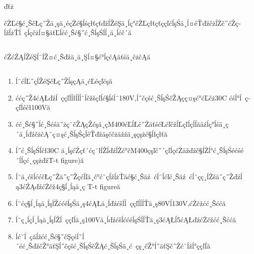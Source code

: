 ďťż\documentclass[10.5pt]{article}
\begin{document}
čŻĽć§ć¸ŠčŁç˝Žä¸şä¸é­çŻć§ĺśçłťçťďźĺŽéŞä¸­ĺç°čŻĽçłťçťççľćĺşŚä¸ĺ¤éŤďźčżĺŻč˝ćŻç­ĺžĺżŤĺ ç­ĺçčżĺ¤§äťĽĺćć¸Šć§˝ć¸ŠĺşŚĺĺ¸ä¸ĺćč´ă
\subsection{\textbf{}}
ćŹćŹĄĺŽéŞĺ¨ĺŽ¤ć¸Šďźä¸ä¸Şĺ¤§ć°ĺçćĄäťśä¸čżčĄă
\subsection{\textbf{}}
\begin{enumerate}
\item ĺ¨ć­ĺĽ˝çĺŽéŞčŁç˝ŽĺşçĄä¸ćĽéçľćşă
\item ććç˝Ž4ćĄŁďźĺ ç­çľĺĺłĺĺĺ¨ĺčžšçľĺć§ĺśĺ¨180V,ĺ˝čçšć¸ŠĺşŚčŽĄçç¤şć°ćĽčż30\degree C ćśĺ°ĺ ç­çľĺéčł100Vă
\item ćć¸Šć§˝ĺć¸Šćśä˝żç¨čŽĄçŽćşä¸­çM400ćĽĺŁč˝ŻäťśćŁćľčžĺĽçľĺçĺĺăäźĺç°ĺśä¸ç´ä¸ĺďźčżčĄ¨ç¤şć¸ŠĺşŚçĺéŤďźäşččżäźźä¸şçşżć§ĺłçłťă
\item ĺ˝ć¸ŠĺşŚĺčł30\degree C ä¸ĺşćŹçť´ćç¨łĺŽĺďźĺŻč°čM400çşľč˝´çľĺçćŻäžďźč§ĺŻĺ°ć¸ŠĺşŚéćśé´ĺĺçć˛çşżďźT-t figure)ă
\label{MYTtFigure}
\item ĺ¨ä¸ćšĺććčŁç˝Žä˝ç˝Žçćĺľä¸č°ć˘ç­ĺžĺżŤăć§ć¸Šäź ćĺ¨ĺćľć¸Šäź ćĺ¨çç¸ĺŻšä˝ç˝Žďźĺą3ćŹĄďźćŻčž4ç§ĺ¸ĺąä¸ç T-t figureă
\item ĺ¨ćç§ĺ¸ĺąä¸ĺşĺŽććéĺşŚä¸ş4ćĄŁä¸ĺďźćšĺĺ ç­çľĺĺĺŤä¸ş80Vĺ130V,ćŻčžćć¸Šććă
\item ĺ¨ç¸ĺçĺ¸ĺąä¸ĺşĺŽĺ ç­çľĺä¸ş100Vä¸ĺďźćšĺććéĺşŚĺĺŤä¸ş3ćĄŁĺ5ćĄŁďźćŻčžćć¸Šććă
\item ĺć­˘ĺ ç­ăĺžćć¸Šć§˝čŞçśĺˇĺ´éć¸ŠďźčŽ°äťŞĺ˝čçšć¸ŠĺşŚčŽĄć¸ŠĺşŚä¸ć çş¸čŽ°ĺ˝äťŞč˝Źć˘ĺžĺ°ççľĺă
\end{enumerate}
\section{\textbf{}}
\end{document}
